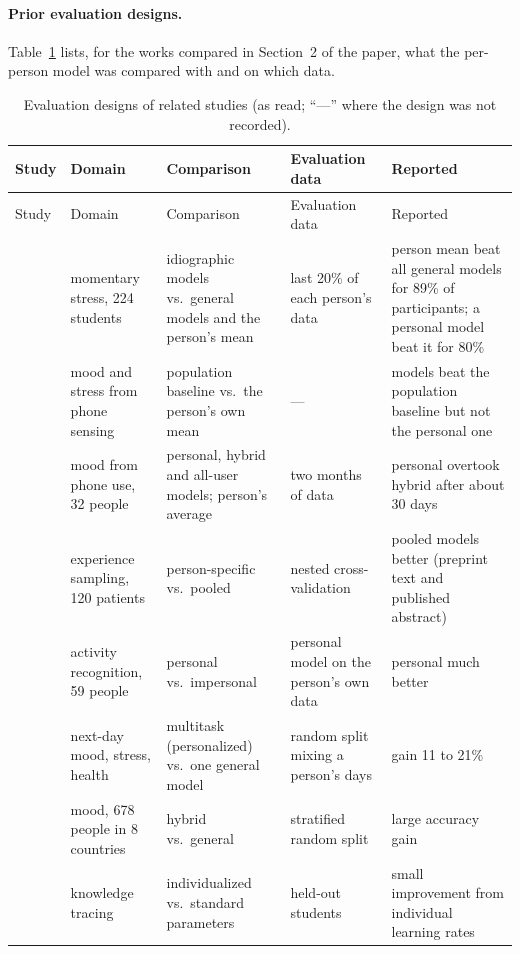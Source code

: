 \documentclass[10pt]{article}
\begin{document}
\paragraph{Prior evaluation designs.} Table~\ref{tab:prior} lists, for the works compared in Section~2 of the paper, what the per-person model was compared with and on which data.

\begin{small}
\begin{longtable}{>{\raggedright}p{2.4cm}>{\raggedright}p{2.6cm}>{\raggedright}p{3.2cm}>{\raggedright}p{3.0cm}>{\raggedright\arraybackslash}p{3.6cm}}
\caption{Evaluation designs of related studies (as read; ``---'' where the design was not recorded).}\label{tab:prior}\\
\toprule
Study & Domain & Comparison & Evaluation data & Reported \\
\midrule\endfirsthead
\toprule
Study & Domain & Comparison & Evaluation data & Reported \\
\midrule\endhead
\citet{Aalbers2023} & momentary stress, 224 students & idiographic models vs.\ general models and the person's mean & last 20\% of each person's data & person mean beat all general models for 89\% of participants; a personal model beat it for 80\% \\
\citet{DeMasi2017} & mood and stress from phone sensing & population baseline vs.\ the person's own mean & --- & models beat the population baseline but not the personal one \\
\citet{LiKamWa2013} & mood from phone use, 32 people & personal, hybrid and all-user models; person's average & two months of data & personal overtook hybrid after about 30 days \\
\citet{Leenaerts2024} & experience sampling, 120 patients & person-specific vs.\ pooled & nested cross-validation & pooled models better (preprint text and published abstract) \\
\citet{Weiss2012} & activity recognition, 59 people & personal vs.\ impersonal & personal model on the person's own data & personal much better \\
\citet{Taylor2020} & next-day mood, stress, health & multitask (personalized) vs.\ one general model & random split mixing a person's days & gain 11 to 21\% \\
\citet{Meegahapola2022} & mood, 678 people in 8 countries & hybrid vs.\ general & stratified random split & large accuracy gain \\
\citet{Yudelson2013} & knowledge tracing & individualized vs.\ standard parameters & held-out students & small improvement from individual learning rates \\

\end{longtable}
\end{small}
\end{document}
